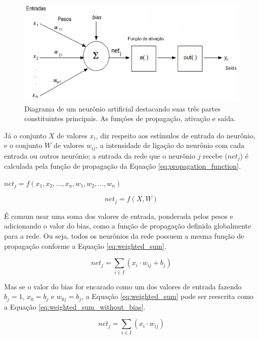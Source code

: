\documentclass[12pt,a4paper]{report}
\begin{document}
	\begin{figure}[H]
		\centering
		\includegraphics[scale=1]{./img/neuronio_artificial.png}
		\caption{Diagrama de um neurônio artificial destacando suas três partes constituintes principais. As funções de propagação, ativação e saída.}
		\label{fig:NeuronioArtificial}
	\end{figure}
	
	Já o conjunto $X$ de valores $x_i$, diz respeito aos estímulos de entrada do neurônio, e o conjunto $W$ de valores $w_{ij}$, a intensidade de ligação do neurônio com cada entrada ou outros neurônio; a entrada da rede que o neurônio $j$ recebe ($net_j$) é calculada pela função de propagação da Equação \ref{eq:propagation_function}.
	
	\centerline{$net_{j}=f(x_1,x_2,...,x_n,w_1,w_2,...,w_n)$}
	\begin{equation}
	net_{j}=f(X,W)
	\label{eq:propagation_function}
	\end{equation}
	
	É comum usar uma soma dos valores de entrada, ponderada pelos pesos e adicionando o valor do bias, como a função de propagação definida globalmente para a rede. Ou seja, todos os neurônios da rede possuem a mesma função de propagação conforme a Equação \ref{eq:weighted_sum}.
	
	\begin{equation}
	net_{j}=\sum_{i \in I}\left ( x_i \cdot w_{ij} + b_j \right )
	\label{eq:weighted_sum}
	\end{equation}
	
	Mas se o valor do bias for encarado como um dos valores de entrada fazendo $b_j=1$, $x_0=b_j$ e $w_{0j}=b_j$, a Equação \ref{eq:weighted_sum} pode ser reescrita como a Equação \ref{eq:weighted_sum_without_bias}.
	
	\begin{equation}
	net_{j}=\sum_{i \in I}\left ( x_i \cdot w_{ij} \right )
	\label{eq:weighted_sum_without_bias}
	\end{equation}
	
\end{document}
